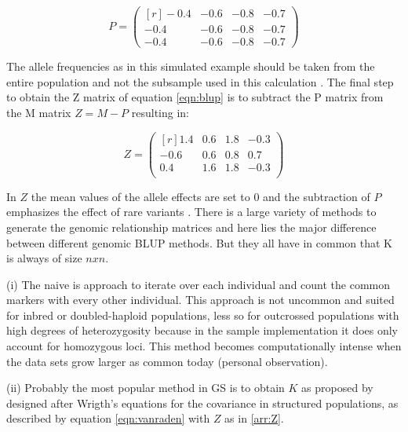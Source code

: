 \begin{equation}
  P = 
  \begin{pmatrix}[r]
   -0.4 & -0.6 & -0.8 & -0.7 \\
   -0.4 & -0.6 & -0.8 & -0.7 \\
   -0.4 & -0.6 & -0.8 & -0.7
  \end{pmatrix}
  \label{arr:P}
\end{equation}

The allele frequencies as in this simulated example should be taken from the entire population and not the
subsample used in this calculation \cite{vanraden2008efficient}.  The final step to obtain the Z matrix of
equation \ref{eqn:blup} is to subtract the P matrix from the M matrix $Z= M - P$ resulting in:

\begin{equation}
  Z = 
  \begin{pmatrix}[r]
    1.4 & 0.6 & 1.8 & -0.3 \\
   -0.6 & 0.6 & 0.8 & 0.7 \\
    0.4 & 1.6 & 1.8 & -0.3 \\

  \end{pmatrix}
  \label{arr:Z}
\end{equation}

In $Z$ the mean values of the allele effects are set to 0 and the subtraction of $P$ emphasizes the effect of
rare variants \cite{vanraden2008efficient}.  There is a large variety of methods to generate the genomic
relationship matrices and here lies the major difference between different genomic BLUP methods. But they all
have in common that K is always of size $n x n$.

(i) The naive is approach to iterate over each individual and count the common markers with every other
individual. This approach is not uncommon and suited for inbred or doubled-haploid populations, less so for
outcrossed populations with high degrees of heterozygosity because in the sample implementation it does only
account for homozygous loci. This method becomes computationally intense when the data sets grow larger as
common today (personal observation).

(ii) Probably the most popular method in GS is to obtain $K$ as proposed by \cite{vanraden2008efficient} designed after Wrigth's \cite{wright1922coefficients} equations for the covariance in structured populations, as described by equation \ref{eqn:vanraden} with $Z$ as in \ref{arr:Z}.

